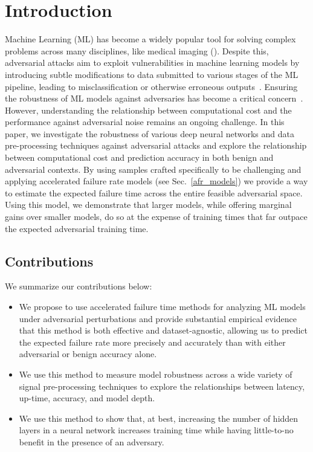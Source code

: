 \section{Introduction}

Machine Learning (ML) has become a widely popular tool for solving complex problems across many disciplines, like medical imaging (\citep{}). Despite this, adversarial attacks aim to exploit vulnerabilities in machine learning models by introducing subtle modifications to data submitted to various stages of the ML pipeline, leading to misclassification or otherwise erroneous outputs~\citep{chakraborty_adversarial_2018}. Ensuring the robustness of ML models against adversaries has become a critical concern~\citep{adversarialpatch,carlini_towards_2017,croce_reliable_2020,hopskipjump,art2018,meyers}. However, understanding the relationship between computational cost and the performance against adversarial noise remains an ongoing challenge.  In this paper, we  investigate the robustness of various deep neural networks and data pre-processing techniques against adversarial attacks and explore the relationship between computational cost and  prediction accuracy in both benign and adversarial contexts.  By using samples crafted specifically to be challenging and applying accelerated failure rate models (see Sec.~\ref{afr_models}) we provide a way to estimate the expected failure time across the entire feasible adversarial space. Using this model, we demonstrate that larger models, while offering marginal gains over smaller models, do so at the expense of training times that far outpace the expected adversarial training time.

\subsection{Contributions}

We summarize our contributions below:
\begin{itemize}
    \item We propose to use accelerated failure time methods for analyzing ML models under adversarial perturbations and provide substantial empirical evidence that this method is both effective and dataset-agnostic, allowing us to predict the expected failure rate more precisely and accurately than with either adversarial or benign accuracy alone.
    \item We use this method to measure model robustness across a wide variety of signal pre-processing techniques to explore the relationships between latency, up-time, accuracy, and model depth.
    \item We use this method to show that, at best, increasing the number of hidden layers in a neural network increases training time while having little-to-no benefit in the presence of an adversary.
\end{itemize}
